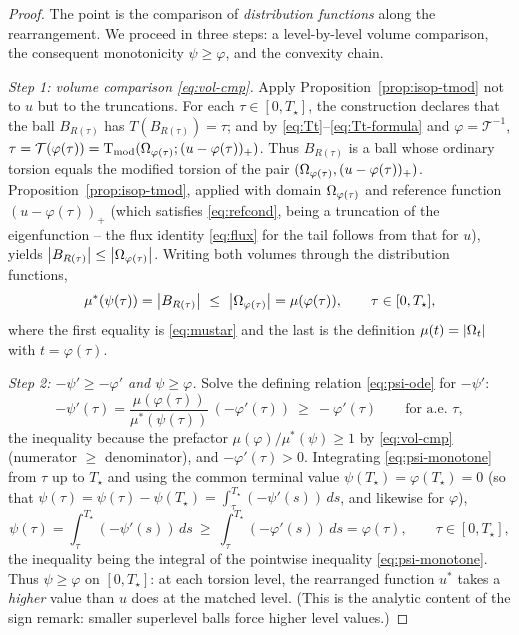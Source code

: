 \begin{proof}
The point is the comparison of \emph{distribution functions} along the
rearrangement. We proceed in three steps: a level-by-level volume
comparison, the consequent monotonicity $\psi\ge\varphi$, and the convexity
chain.

\emph{Step 1: volume comparison \eqref{eq:vol-cmp}.} Apply
Proposition~\ref{prop:isop-tmod} not to $u$ but to the truncations. For each
$\tau\in[0,T_\star]$, the construction declares that the ball $B_{R(\tau)}$
has $T(B_{R(\tau)})=\tau$; and by \eqref{eq:Tt}--\eqref{eq:Tt-formula} and
$\varphi=\mathcal T^{-1}$,
$\tau=\mathcal T(\varphi(\tau))=\operatorname{T_{\mathrm{mod}}}(\Omega_{\varphi(\tau)};
(u-\varphi(\tau))_+)$. Thus $B_{R(\tau)}$ is a ball whose ordinary torsion
equals the modified torsion of the pair $(\Omega_{\varphi(\tau)},
(u-\varphi(\tau))_+)$. Proposition~\ref{prop:isop-tmod}, applied with domain
$\Omega_{\varphi(\tau)}$ and reference function $(u-\varphi(\tau))_+$ (which
satisfies \eqref{eq:refcond}, being a truncation of the eigenfunction --
the flux identity \eqref{eq:flux} for the tail follows from that for $u$),
yields $\left|B_{R(\tau)}\right|\le\left|\Omega_{\varphi(\tau)}\right|$. Writing both volumes
through the distribution functions,
\begin{equation}\label{eq:vol-cmp}
  \mu^*(\psi(\tau))=\left|B_{R(\tau)}\right|\ \le\ \left|\Omega_{\varphi(\tau)}\right|
  =\mu(\varphi(\tau)),\qquad\tau\in[0,T_\star],
\end{equation}
where the first equality is \eqref{eq:mustar} and the last is the definition
$\mu(t)=\left|\Omega_t\right|$ with $t=\varphi(\tau)$.

\emph{Step 2: $-\psi'\ge-\varphi'$ and $\psi\ge\varphi$.} Solve the defining
relation \eqref{eq:psi-ode} for $-\psi'$:
\begin{equation}\label{eq:psi-monotone}
  -\psi'(\tau)=\frac{\mu(\varphi(\tau))}{\mu^*(\psi(\tau))}\,(-\varphi'(\tau))
  \ \ge\ -\varphi'(\tau)\qquad\text{for a.e.\ }\tau,
\end{equation}
the inequality because the prefactor $\mu(\varphi)/\mu^*(\psi)\ge1$ by
\eqref{eq:vol-cmp} (numerator $\ge$ denominator), and $-\varphi'(\tau)>0$.
Integrating \eqref{eq:psi-monotone} from $\tau$ up to $T_\star$ and using the
common terminal value $\psi(T_\star)=\varphi(T_\star)=0$ (so that
$\psi(\tau)=\psi(\tau)-\psi(T_\star)=\int_\tau^{T_\star}(-\psi'(s))\,ds$, and
likewise for $\varphi$),
\begin{equation}\label{eq:psi-ge-phi}
  \psi(\tau)=\int_\tau^{T_\star}(-\psi'(s))\,ds
  \ \ge\ \int_\tau^{T_\star}(-\varphi'(s))\,ds=\varphi(\tau),
  \qquad\tau\in[0,T_\star],
\end{equation}
the inequality being the integral of the pointwise inequality
\eqref{eq:psi-monotone}. Thus $\psi\ge\varphi$ on $[0,T_\star]$: at each
torsion level, the rearranged function $u^*$ takes a \emph{higher} value than
$u$ does at the matched level. (This is the analytic content of the sign
remark: smaller superlevel balls force higher level values.)


\end{proof}
